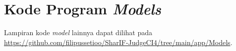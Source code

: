 \chapter{Kode Program \textit{Models}}
\label{lamp:B}





Lampiran kode \textit{model} lainnya dapat dilihat pada \url{https://github.com/filipussetioo/SharIF-JudgeCI4/tree/main/app/Models}.